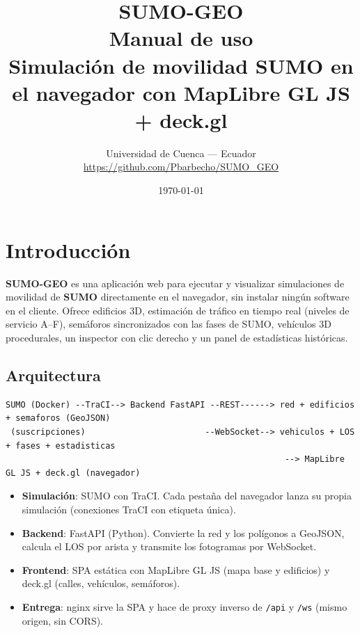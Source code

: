 \documentclass[11pt,a4paper]{article}
\title{\textbf{SUMO-GEO}\\[4pt]\Large Manual de uso\\[6pt]
\large Simulación de movilidad SUMO en el navegador con MapLibre GL JS + deck.gl}
\author{Universidad de Cuenca --- Ecuador\\
\small\url{https://github.com/Pbarbecho/SUMO_GEO}}
\date{\today}
\begin{document}
\maketitle
\tableofcontents
\newpage

\section{Introducción}

\textbf{SUMO-GEO} es una aplicación web para ejecutar y visualizar simulaciones
de movilidad de \textbf{SUMO} directamente en el navegador, sin instalar ningún
software en el cliente. Ofrece edificios 3D, estimación de tráfico en tiempo
real (niveles de servicio A--F), semáforos sincronizados con las fases de SUMO,
vehículos 3D procedurales, un inspector con clic derecho y un panel de
estadísticas históricas.

\subsection{Arquitectura}

\begin{lstlisting}
SUMO (Docker) --TraCI--> Backend FastAPI --REST------> red + edificios + semaforos (GeoJSON)
 (suscripciones)                        --WebSocket--> vehiculos + LOS + fases + estadisticas
                                                        --> MapLibre GL JS + deck.gl (navegador)
\end{lstlisting}

\begin{itemize}
  \item \textbf{Simulación}: SUMO con TraCI. Cada pestaña del navegador lanza su
        propia simulación (conexiones TraCI con etiqueta única).
  \item \textbf{Backend}: FastAPI (Python). Convierte la red y los polígonos a
        GeoJSON, calcula el LOS por arista y transmite los fotogramas por WebSocket.
  \item \textbf{Frontend}: SPA estática con MapLibre GL JS (mapa base y edificios)
        y deck.gl (calles, vehículos, semáforos).
  \item \textbf{Entrega}: nginx sirve la SPA y hace de proxy inverso de
        \texttt{/api} y \texttt{/ws} (mismo origen, sin CORS).
\end{itemize}

\end{document}
